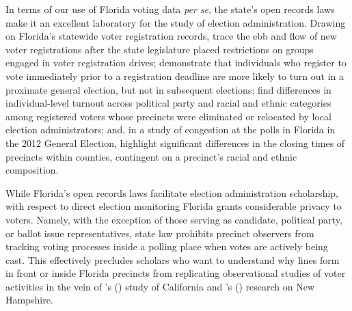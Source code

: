 \documentclass[12pt,titlepage]{article}
\newcommand{\possessivecite}[1]{\citeauthor{#1}'s (\citeyear{#1})}
\begin{document}

In terms of our use of Florida voting data \emph{per se}, the state's
open records laws make it an excellent laboratory for the study of
election administration.  Drawing on Florida's statewide voter
registration records, \cite{herron_smith2013} trace the ebb and flow
of new voter registrations after the state legislature placed
restrictions on groups engaged in voter registration drives;
\cite{shinosmith:registrationtiming} demonstrate that individuals who
register to vote immediately prior to a registration deadline are more
likely to turn out in a proximate general election, but not in
subsequent elections; \cite{amos_etal2017} find differences in
individual-level turnout across political party and racial and ethnic
categories among registered voters whose precincts were eliminated or
relocated by local election administrators; and, in a study of
congestion at the polls in Florida in the 2012 General Election,
\cite{herronsmith:closingtimes} highlight significant differences in
the closing times of precincts within counties, contingent on a
precinct's racial and ethnic composition.



While Florida's open records laws facilitate election administration
scholarship, with respect to direct election monitoring Florida grants
considerable privacy to voters.  Namely, with the exception of those
serving as candidate, political party, or ballot issue
representatives, state law prohibits precinct observers from tracking
voting processes inside a polling place when votes are actively being
cast. This effectively precludes scholars who want to understand why
lines form in front or inside Florida precincts from replicating
observational studies of voter activities in the vein of
\possessivecite{spencermarkovits:renege} study of California and
\possessivecite{herronsmith:hanoverstudy} research on New Hampshire.
\end{document}
